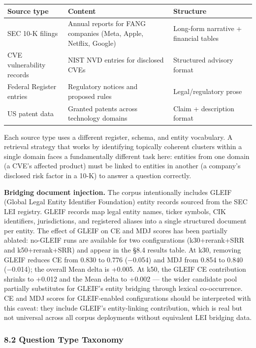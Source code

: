 \documentclass[
]{article}
\begin{document}
\begin{small}
\setlength{\tabcolsep}{4pt}
\begin{longtable}{p{1.5in}p{2.5in}p{2.3in}}
\toprule
\textbf{Source type} & \textbf{Content} & \textbf{Structure} \\
\midrule
\endhead
SEC 10-K filings & Annual reports for FANG companies (Meta, Apple, Netflix, Google) & Long-form narrative + financial tables \\
CVE vulnerability records & NIST NVD entries for disclosed CVEs & Structured advisory format \\
Federal Register entries & Regulatory notices and proposed rules & Legal/regulatory prose \\
US patent data & Granted patents across technology domains & Claim + description format \\
\bottomrule
\end{longtable}
\end{small}

Each source type uses a different register, schema, and entity
vocabulary. A retrieval strategy that works by identifying topically
coherent clusters within a single domain faces a fundamentally different
task here: entities from one domain (a CVE's affected product) must be
linked to entities in another (a company's disclosed risk factor in a
10-K) to answer a question correctly.

\textbf{Bridging document injection.} The corpus intentionally includes
GLEIF (Global Legal Entity Identifier Foundation) entity records sourced
from the SEC LEI registry. GLEIF records map legal entity names, ticker
symbols, CIK identifiers, jurisdictions, and registered aliases into a
single structured document per entity. The effect of GLEIF on CE and MDJ
scores has been partially ablated: no-GLEIF runs are available for two
configurations (k30+rerank+SRR and k50+rerank+SRR) and appear in the
§8.4 results table. At k30, removing GLEIF reduces CE from 0.830 to
0.776 (−0.054) and MDJ from 0.854 to 0.840 (−0.014); the overall Mean
delta is +0.005. At k50, the GLEIF CE contribution shrinks to +0.012 and
the Mean delta to +0.002 --- the wider candidate pool partially
substitutes for GLEIF's entity bridging through lexical co-occurrence.
CE and MDJ scores for GLEIF-enabled configurations should be interpreted
with this caveat: they include GLEIF's entity-linking contribution,
which is real but not universal across all corpus deployments without
equivalent LEI bridging data.

\subsubsection{8.2 Question Type Taxonomy}\label{question-type-taxonomy}
\end{document}

